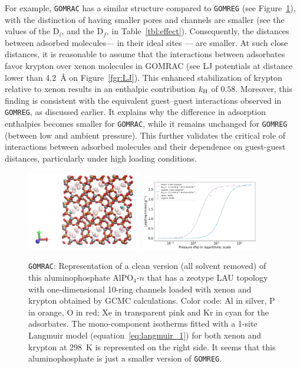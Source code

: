 \documentclass[main.tex]{subfiles}
\begin{document}
For example, \texttt{GOMRAC} has a similar structure compared to \texttt{GOMREG} (see Figure~\ref{fgr:SI:examples:GOMRAC}), with the distinction of having smaller pores and channels are smaller (see the values of the D$_i$, and the D$_f$, in Table~\ref{tbl:effect}). Consequently, the distances between adsorbed molecules--- in their ideal sites ---  are smaller. At such close distances, it is reasonable to assume that the interactions between adsorbates favor krypton over xenon molecules in GOMRAC (see LJ potentials at distance lower than \SI{4.2}{\angstrom} on Figure~\ref{fgr:LJ}). This enhanced stabilization of krypton relative to xenon results in an enthalpic contribution $k_{\text{H}}$ of $0.58$. Moreover, this finding is consistent with the equivalent guest--guest interactions observed in \texttt{GOMREG}, as discussed earlier. It explains why the difference in adsorption enthalpies becomes smaller for \texttt{GOMRAC}, while it remains unchanged for \texttt{GOMREG} (between low and ambient pressure). This further validates the critical role of interactions between adsorbed molecules and their dependence on guest-guest distances, particularly under high loading conditions.

\begin{figure}[ht]
  \centering
    \includegraphics[width=0.45\textwidth]{figures/2-thermo/GOMRAC_clean.jpg}
    \includegraphics[width=0.45\textwidth]{figures/2-thermo/GOMRAC_clean_isotherm_xenon_krypton_298K.jpg}
    \caption{\texttt{GOMRAC}: Representation of a clean version (all solvent removed) of this aluminophosphate AlPO$_4$-$n$ that has a zeotype LAU topology with one-dimensional 10-ring channels loaded with xenon and krypton obtained by GCMC calculations. Color code: Al in silver, P in orange, O in red; Xe in transparent pink and Kr in cyan for the adsorbates. The mono-component isotherms fitted with a 1-site Langmuir model (equation~\ref{eq:langmuir_1}) for both xenon and krypton at \SI{298}{\kelvin} is represented on the right side. It seems that this aluminophosphate is just a smaller version of \texttt{GOMREG}.}\label{fgr:SI:examples:GOMRAC}
  \end{figure}
\end{document}
